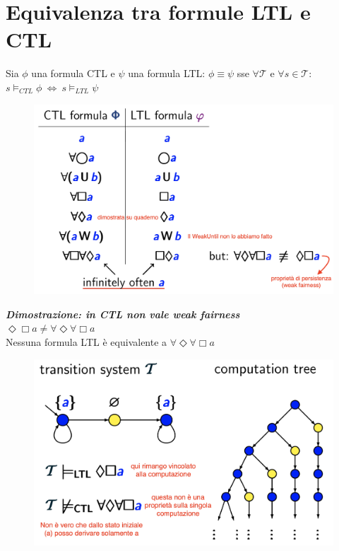 \documentclass[a4paper, notitlepage, 9pt]{extreport}
\begin{document}
\section*{Equivalenza tra formule LTL e CTL}
Sia $\phi$ una formula CTL e $\psi$ una formula LTL: $\phi \equiv \psi$ sse $\forall \mathcal{T}$ e $\forall s \in \mathcal{T}$: ~$s \vDash_{CTL} \phi ~\Leftrightarrow~ s \vDash_{LTL} \psi$
\begin{multicols}{2}
	\begin{figure}[H]
		\centering
		\includegraphics[scale=0.2]{CTLvLTL}
	\end{figure}
\columnbreak
	\noindent
	\textit{\textbf{Dimostrazione: in CTL non vale weak fairness}}\\
	$\Diamond \Box a \neq \forall \Diamond \forall \Box a$\\
	Nessuna formula LTL è equivalente a $\forall \Diamond \forall \Box a$
	\begin{figure}[H]
		\centering
		\includegraphics[scale=0.16]{vs1}
	\end{figure}
\end{multicols}
\end{document}
